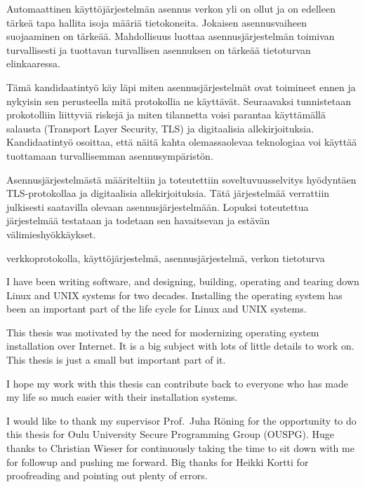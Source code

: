 \documentclass[a4paper,12pt,titlepage]{dithesis}
\begin{document}
\begin{tiivistelma}

Automaattinen käyttöjärjestelmän asennus verkon yli on ollut ja on
edelleen tärkeä tapa hallita isoja määriä tietokoneita. Jokaisen
asennusvaiheen suojaaminen on tärkeää. Mahdollisuus luottaa
asennusjärjestelmän toimivan turvallisesti ja tuottavan turvallisen
asennuksen on tärkeää tietoturvan elinkaaressa.

Tämä kandidaatintyö käy läpi miten asennusjärjestelmät ovat toimineet
ennen ja nykyisin sen perusteella mitä protokollia ne
käyttävät. Seuraavaksi tunnistetaan prokotolliin liittyviä riskejä ja
miten tilannetta voisi parantaa käyttämällä salausta (Transport Layer
Security, TLS) ja digitaalisia allekirjoituksia. Kandidaatintyö
osoittaa, että näitä kahta olemassaolevaa teknologiaa voi käyttää
tuottamaan turvallisemman asennusympäristön.

Asennusjärjestelmästä määriteltiin ja toteutettiin soveltuvuusselvitys
hyödyntäen TLS-protokollaa ja digitaalisia allekirjoituksia. Tätä
järjestelmää verrattiin julkisesti saatavilla olevaan
asennusjärjestelmään. Lopuksi toteutettua järjestelmää testataan ja
todetaan sen havaitsevan ja estävän välimieshyökkäykset.

\avainsanat verkkoprotokolla, käyttöjärjestelmä, asennusjärjestelmä, verkon tietoturva
\end{tiivistelma}


\sisluettelo


I have been writing software, and designing, building, operating and
tearing down Linux and UNIX systems for two decades. Installing the
operating system has been an important part of the life cycle for
Linux and UNIX systems.

This thesis was motivated by the need for modernizing operating system
installation over Internet. It is a big subject with lots of little
details to work on. This thesis is just a small but important part of
it.

I hope my work with this thesis can contribute back to everyone who
has made my life so much easier with their installation systems.

I would like to thank my supervisor Prof.\ Juha Röning for the
opportunity to do this thesis for Oulu University Secure Programming
Group (OUSPG). Huge thanks to Christian Wieser for continuously taking
the time to sit down with me for followup and pushing me forward. Big
thanks for Heikki Kortti for proofreading and pointing out plenty of
errors.
\end{document}
